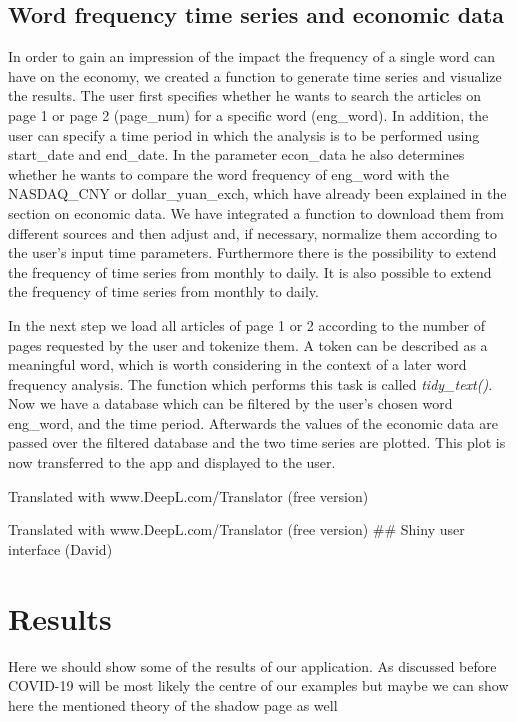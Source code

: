 \documentclass[12pt,a4paper]{article}
\begin{document}
\hypertarget{word-frequency-time-series-and-economic-data}{%
\subsection{Word frequency time series and economic data}\label{word-frequency-time-series-and-economic-data}}

In order to gain an impression of the impact the frequency of a single word can have on the economy, we created a function to generate time series and visualize the results. The user first specifies whether he wants to search the articles on page 1 or page 2 (page\_num) for a specific word (eng\_word). In addition, the user can specify a time period in which the analysis is to be performed using start\_date and end\_date. In the parameter econ\_data he also determines whether he wants to compare the word frequency of eng\_word with the NASDAQ\_CNY or dollar\_yuan\_exch, which have already been explained in the section on economic data. We have integrated a function to download them from different sources and then adjust and, if necessary, normalize them according to the user's input time parameters. Furthermore there is the possibility to extend the frequency of time series from monthly to daily.
It is also possible to extend the frequency of time series from monthly to daily.

In the next step we load all articles of page 1 or 2 according to the number of pages requested by the user and tokenize them. A token can be described as a meaningful word, which is worth considering in the context of a later word frequency analysis. The function which performs this task is called \emph{tidy\_text()}. Now we have a database which can be filtered by the user's chosen word eng\_word, and the time period. Afterwards the values of the economic data are passed over the filtered database and the two time series are plotted. This plot is now transferred to the app and displayed to the user.

Translated with www.DeepL.com/Translator (free version)

Translated with www.DeepL.com/Translator (free version)
\#\# Shiny user interface (David)

\hypertarget{results}{%
\section{Results}\label{results}}

Here we should show some of the results of our application. As discussed before COVID-19 will be most likely the centre of our examples but maybe we can show here the mentioned theory of the shadow page as well
\end{document}
